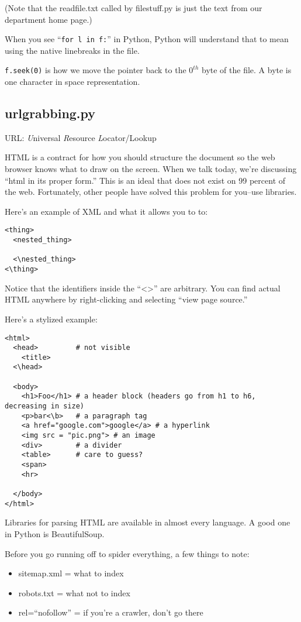 \documentclass[12pt,letter]{article}
\begin{document}
(Note that the readfile.txt called by filestuff.py is just the text
from our department home page.) 

When you see ``\texttt{for l in f:}'' in Python, Python will
understand that to mean using the native linebreaks in the file. 

\texttt{f.seek(0)} is how we move the pointer back to the $0^{th}$
byte of the file. A byte is one character in space representation. 

\subsection{urlgrabbing.py}
URL: \emph{U}niversal \emph{R}esource \emph{L}ocator/Lookup

HTML is a contract for how you should structure the document so the
web browser knows what to draw on the screen. When we talk today,
we're discussing ``html in its proper form.'' This is an ideal that
does not exist on 99 percent of the web. Fortunately, other people
have solved this problem for you--use libraries.

Here's an example of XML and what it allows you to to:
\begin{verbatim}
<thing>
  <nested_thing>

  <\nested_thing>
<\thing>
\end{verbatim}
Notice that the identifiers inside the ``<>'' are arbitrary. You can
find actual HTML anywhere by right-clicking and selecting ``view page
source.''

Here's a stylized example:
\begin{verbatim}
<html>
  <head>         # not visible
    <title>
  <\head>

  <body>
    <h1>Foo</h1> # a header block (headers go from h1 to h6,
decreasing in size)
    <p>bar<\b>   # a paragraph tag
    <a href="google.com">google</a> # a hyperlink
    <img src = "pic.png"> # an image
    <div>        # a divider
    <table>      # care to guess?
    <span>
    <hr>

  </body>
</html>
\end{verbatim}

Libraries for parsing HTML are available in almost every language. A
good one in Python is BeautifulSoup.\footnotemark {}

Before you go running off to spider everything, a few things to note:
\begin{itemize}
\item sitemap.xml = what to index
\item robots.txt = what not to index
\item rel=``nofollow'' = if you're a crawler, don't go there
\end{itemize}
\end{document}
